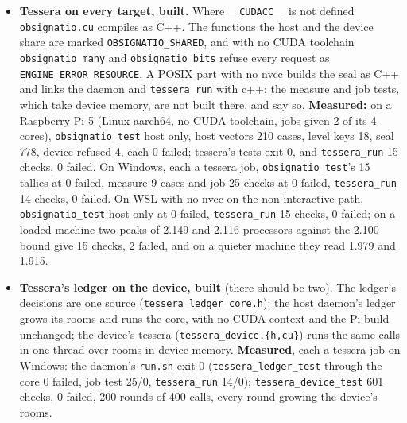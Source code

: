 \begin{enumerate}
\begin{itemize}
\begin{itemize}
\begin{itemize}
\item \textbf{Tessera on every target, built.} Where \texttt{\_\allowbreak{}\_\allowbreak{}CUDACC\_\allowbreak{}\_\allowbreak{}} is not defined \texttt{obsignatio.\allowbreak{}cu} compiles as C++. The functions the host and the device share are marked \texttt{OBSIGNATIO\_\allowbreak{}SHARED}, and with no CUDA toolchain \texttt{obsignatio\_\allowbreak{}many} and \texttt{obsignatio\_\allowbreak{}bits} refuse every request as \texttt{ENGINE\_\allowbreak{}ERROR\_\allowbreak{}RESOURCE}. A POSIX part with no nvcc builds the seal as C++ and links the daemon and \texttt{tessera\_\allowbreak{}run} with c++; the measure and job tests, which take device memory, are not built there, and say so. \textbf{Measured:} on a Raspberry Pi 5 (Linux aarch64, no CUDA toolchain, jobs given 2 of its 4 cores), \texttt{obsignatio\_\allowbreak{}test} host only, host vectors 210 cases, level keys 18, seal 778, device refused 4, each 0 failed; tessera's tests exit 0, and \texttt{tessera\_\allowbreak{}run} 15 checks, 0 failed. On Windows, each a tessera job, \texttt{obsignatio\_\allowbreak{}test}'s 15 tallies at 0 failed, measure 9 cases and job 25 checks at 0 failed, \texttt{tessera\_\allowbreak{}run} 14 checks, 0 failed. On WSL with no nvcc on the non-interactive path, \texttt{obsignatio\_\allowbreak{}test} host only at 0 failed, \texttt{tessera\_\allowbreak{}run} 15 checks, 0 failed; on a loaded machine two peaks of 2.149 and 2.116 processors against the 2.100 bound give 15 checks, 2 failed, and on a quieter machine they read 1.979 and 1.915.
\item \textbf{Tessera's ledger on the device, built} (there should be two). The ledger's decisions are one source (\texttt{tessera\_\allowbreak{}ledger\_\allowbreak{}core.\allowbreak{}h}): the host daemon's ledger grows its rooms and runs the core, with no CUDA context and the Pi build unchanged; the device's tessera (\texttt{tessera\_\allowbreak{}device.\allowbreak{}\{h,cu\}}) runs the same calls in one thread over rooms in device memory. \textbf{Measured}, each a tessera job on Windows: the daemon's \texttt{run.\allowbreak{}sh} exit 0 (\texttt{tessera\_\allowbreak{}ledger\_\allowbreak{}test} through the core 0 failed, job test 25/0, \texttt{tessera\_\allowbreak{}run} 14/0); \texttt{tessera\_\allowbreak{}device\_\allowbreak{}test} 601 checks, 0 failed, 200 rounds of 400 calls, every round growing the device's rooms.
\end{itemize}
\end{itemize}

\end{itemize}
\end{enumerate}
